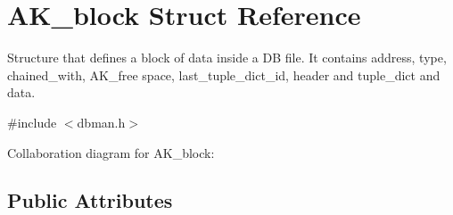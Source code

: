 \hypertarget{structAK__block}{}\section{A\+K\+\_\+block Struct Reference}
\label{structAK__block}


Structure that defines a block of data inside a DB file. It contains address, type, chained\+\_\+with, A\+K\+\_\+free space, last\+\_\+tuple\+\_\+dict\+\_\+id, header and tuple\+\_\+dict and data.  




{\ttfamily \#include $<$dbman.\+h$>$}



Collaboration diagram for A\+K\+\_\+block\+:
\subsection*{Public Attributes}
